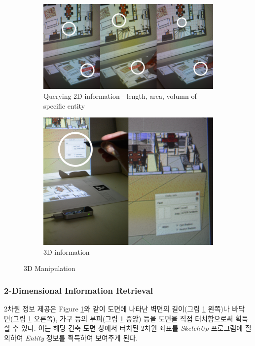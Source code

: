 \begin{figure}[!ht]
	\centering
        \begin{subfigure}[b]{0.55\textwidth}
	        \centering
                \includegraphics[width=\textwidth]{4-Interaction_Design/2d_info}
                \caption{Querying 2D information - length, area, volumn of specific entity}
                \label{fig:2d_info}
        \end{subfigure}%
        \hfill
        \begin{subfigure}[b]{0.37\textwidth}
            \centering
            \includegraphics[width=\textwidth]{4-Interaction_Design/3d_info}
                \caption{3D information}
                \label{fig:3d_info}
        \end{subfigure}
	\caption{3D Manipulation}
    \label{fig:infor}
\end{figure}

\subsubsection{2-Dimensional Information Retrieval}
2차원 정보 제공은 Figure \ref{fig:2d_info}와 같이 도면에 나타난 벽면의 길이(그림 \ref{fig:2d_info} 왼쪽)나 바닥 면(그림 \ref{fig:2d_info} 오른쪽), 가구 등의 부피(그림 \ref{fig:2d_info} 중앙) 등을 도면을 직접 터치함으로써 획득할 수 있다. 이는 해당 건축 도면 상에서 터치된 2차원 좌표를 \textit{SketchUp} 프로그램에 질의하여 \textit{Entity} 정보를 획득하여 보여주게 된다.
